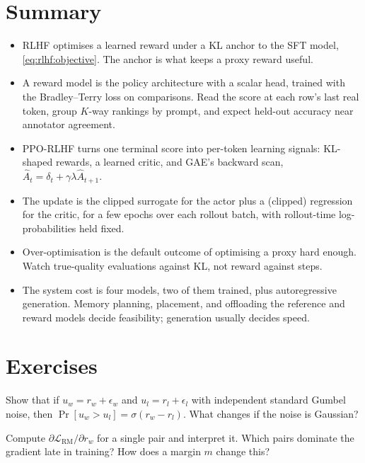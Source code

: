 \section{Summary}\label{sec:rlhf:summary}
\begin{itemize}
  \item RLHF optimises a learned reward under a KL anchor to the SFT model,
        \cref{eq:rlhf:objective}. The anchor is what keeps a proxy reward useful.
  \item A reward model is the policy architecture with a scalar head, trained with the Bradley--Terry loss
        on comparisons. Read the score at each row's last real token, group $K$-way rankings by prompt,
        and expect held-out accuracy near annotator agreement.
  \item PPO-RLHF turns one terminal score into per-token learning signals: KL-shaped rewards,
        a learned critic, and GAE's backward scan, $\hat A_t=\delta_t+\gamma\lambda\hat A_{t+1}$.
  \item The update is the clipped surrogate for the actor plus a (clipped) regression for the critic,
        for a few epochs over each rollout batch, with rollout-time log-probabilities held fixed.
  \item Over-optimisation is the default outcome of optimising a proxy hard enough. Watch true-quality
        evaluations against KL, not reward against steps.
  \item The system cost is four models, two of them trained, plus autoregressive generation. Memory planning,
        placement, and offloading the reference and reward models decide feasibility; generation usually decides speed.
\end{itemize}

\section{Exercises}\label{sec:rlhf:exercises}

\begin{exercise}
Show that if $u_w = r_w + \epsilon_w$ and $u_l = r_l + \epsilon_l$ with independent standard Gumbel noise,
then $\Pr[u_w > u_l] = \sigma(r_w - r_l)$. What changes if the noise is Gaussian?
\end{exercise}

\begin{exercise}
Compute $\partial\mathcal{L}_{\text{RM}}/\partial r_w$ for a single pair and interpret it. Which pairs
dominate the gradient late in training? How does a margin $m$ change this?
\end{exercise}


